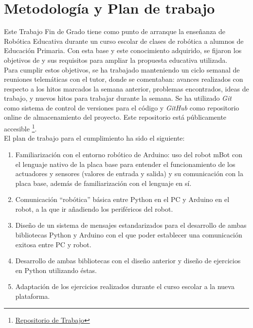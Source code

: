 \section{Metodología y Plan de trabajo}\label{sec:metologia}
Este Trabajo Fin de Grado tiene como punto de arranque la enseñanza de Robótica Educativa durante un curso escolar de clases de robótica a alumnos de Educación Primaria. Con esta base y este conocimiento adquirido, se fijaron los objetivos de y sus requisitos para ampliar la propuesta educativa utilizada.\\
Para cumplir estos objetivos, se ha trabajado manteniendo un ciclo semanal de reuniones telemáticas con el tutor, donde se comentaban: avances realizados con respecto a los hitos marcados la semana anterior, problemas encontrados, ideas de trabajo, y nuevos hitos para trabajar durante la semana. Se ha utilizado \textit{Git} como sistema de control de versiones para el código y \textit{GitHub} como repositorio online de almacenamiento del proyecto. Este repositorio está públicamente accesible \footnote{\href{https://github.com/RoboticsLabURJC/2017-tfg-eva_garcia}{Repositorio de Trabajo}}.\\
El plan de trabajo para el cumplimiento ha sido el siguiente:
\begin{enumerate}
	\item Familiarización con el entorno robótico de Arduino: uso del robot mBot con el lenguaje nativo de la placa base para entender el funcionamiento de los actuadores y sensores (valores de entrada y salida) y su comunicación con la placa base, además de familiarización con el lenguaje en sí. 
	\item Comunicación ``robótica'' básica entre Python en el PC y Arduino en el robot, a la que ir añadiendo los periféricos del robot.
	\item Diseño de un sistema de mensajes estandarizados para el desarrollo de ambas bibliotecas Python y Arduino con el que poder establecer una comunicación exitosa entre PC y robot.
	\item Desarrollo de ambas bibliotecas con el diseño anterior y diseño de ejercicios en Python utilizando éstas.
	\item Adaptación de los ejercicios realizados durante el curso escolar a la nueva plataforma.
\end{enumerate}
